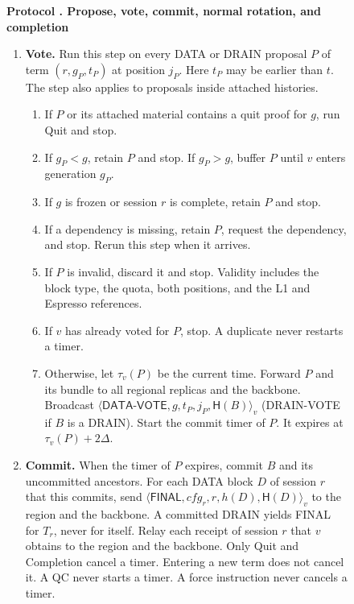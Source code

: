 \documentclass[11pt,a4paper]{article}
\newcommand{\RR}[1]{{\color{rrRed}#1}}
\newcommand{\Hash}{\mathsf H}
\newcommand{\tagg}[1]{\ensuremath{\mathsf{#1}}}
\newcounter{protocol}
\newenvironment{protocol}[2]{\begin{figure}[htbp]\refstepcounter{protocol}\label{#1}
\begin{mdframed}[linewidth=.6pt,skipabove=0pt,skipbelow=0pt,
innertopmargin=7pt,innerbottommargin=7pt]\small
\textbf{Protocol \theprotocol. #2}\par\smallskip}{\end{mdframed}\end{figure}}
\begin{document}
\begin{protocol}{alg:steady}{Propose, vote, commit, normal rotation\RR{, and completion}}
\begin{enumerate}[label=\textbf{\arabic*)},itemsep=3pt]
\item \textbf{Vote.} Run this step on every DATA \RR{or DRAIN} proposal
$P$ of term $(r,g_P,t_P)$ at position $j_P$. Here $t_P$ may be earlier
than $t$. The step also applies to proposals inside attached histories.
 \begin{enumerate}[label=(\alph*)]
 \item If $P$ or its attached material contains a quit proof for $g$,
       run Quit and stop.
 \item If $g_P<g$, retain $P$ and stop. If $g_P>g$, buffer $P$
       until $v$ enters generation $g_P$.
 \item If $g$ is frozen \RR{or session $r$ is complete}, retain $P$ and
       stop.
 \item If a dependency is missing, retain $P$, request the dependency,
       and stop. Rerun this step when it arrives.
 \item If $P$ is invalid, discard it and stop. \RR{Validity includes the
       block type, the quota, both positions, and the L1 and Espresso references.}
 \item If $v$ has already voted for $P$, stop.
       A duplicate never restarts a timer.
 \item Otherwise, let $\tau_v(P)$ be the current time. Forward $P$ and
       its bundle to all \RR{regional replicas and the backbone. }
       Broadcast
       $\langle\tagg{DATA\mbox{-}VOTE},g,t_P,j_P,\Hash(B)\rangle_v$
       \RR{(DRAIN-VOTE if $B$ is a DRAIN)}.
       Start the commit timer of $P$. It expires at $\tau_v(P)+2\Delta$.
 \end{enumerate}

\item \textbf{Commit.} When the timer of $P$ expires, commit $B$ and
its uncommitted ancestors. \RR{For each DATA block $D$ of session $r$
that this commits, send
$\langle\tagg{FINAL},\mathit{cfg}_r,r,h(D),\Hash(D)\rangle_v$ to the region
and the backbone. A committed DRAIN yields FINAL for $T_r$, never for
itself. Relay each receipt of session $r$ that $v$ obtains to the region
and the backbone.} Only Quit \RR{and Completion} cancel a timer. Entering a
new term does not cancel it. A QC never starts a timer. \RR{A force
instruction never cancels a timer.}


\end{enumerate}
\end{protocol}
\end{document}
